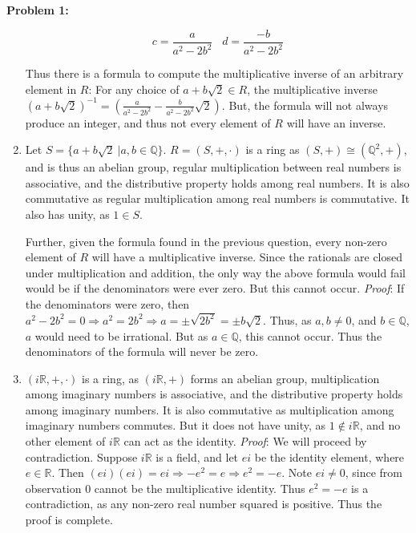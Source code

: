 \documentclass[12pt, letterpaper]{article}
\newenvironment{problem}
    [1]
    {\noindent \textbf{Problem #1:}}
    {\vspace{3mm}}
\begin{document}
\begin{problem}{1}
\begin{enumerate}
        $$
            c = \frac{a}{a^2-2b^2} \;\;\; d = \frac{-b}{a^2-2b^2}
        $$

        Thus there is a formula to compute the multiplicative inverse of an arbitrary element in $R$:
        For any choice of $a + b\sqrt{2} \in R$, the multiplicative inverse $(a + b\sqrt{2})^{-1} = 
        (\frac{a}{a^2-2b^2} - \frac{b}{a^2-2b^2}\sqrt{2})$. But, the formula will not always produce 
        an integer, and thus not every element of $R$ will have an inverse.
        

        \item Let $S = \{a+b\sqrt{2}\ | a, b \in \mathbb{Q}\}$. $R = (S, +, \cdot)$ is a ring as 
        $(S, +) \cong (\mathbb{Q}^2, +)$, and is thus an abelian group, regular multiplication 
        between real numbers is associative, and the distributive property holds among real numbers.
        It is also commutative as regular multiplication among real numbers is commutative. It also 
        has unity, as $1 \in S$.

        \bigskip\noindent
        Further, given the formula found in the previous question, every non-zero element of $R$ will 
        have a multiplicative inverse. Since the rationals are closed under multiplication and addition, the
        only way the above formula would fail would be if the denominators were ever zero. But this
        cannot occur. \emph{Proof}: If the denominators were zero, then $a^2-2b^2 = 0 \Rightarrow
        a^2 = 2b^2 \Rightarrow a = \pm\sqrt{2b^2} = \pm b\sqrt{2}$. Thus, as $a, b \neq 0$, and
        $b \in \mathbb{Q}$, $a$ would need to be irrational. But as $a \in \mathbb{Q}$, this cannot
        occur. Thus the denominators of the formula will never be zero.
        
        \item $(i\mathbb{R}, +, \cdot)$ is a ring, as $(i\mathbb{R}, +)$ forms an abelian group,
        multiplication among imaginary numbers is associative, and the distributive property
        holds among imaginary numbers. It is also commutative as multiplication among imaginary
        numbers commutes. But it does not have unity, as $1 \notin i\mathbb{R}$, and no other
        element of $i\mathbb{R}$ can act as the identity. \emph{Proof}: We will proceed by 
        contradiction. Suppose $i\mathbb{R}$ is a field, and let $ei$ be the identity element,
        where $e \in \mathbb{R}$. Then $(ei)(ei) = ei \Rightarrow -e^2 = e \Rightarrow e^2 = -e$.
        Note $ei \neq 0$, since from observation $0$ cannot be the multiplicative identity. Thus
        $e^2 = -e$ is a contradiction, as any non-zero real number squared is positive. Thus the 
        proof is complete. 
    \end{enumerate}
\end{problem}
\end{document}
